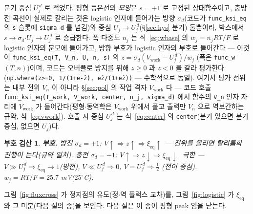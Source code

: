 \documentclass[11pt,a4paper]{article}
\newtheorem*{signbox}{부호 검산}
\newcommand{\eq}{\mathrm{eq}}
\newcommand{\work}{\mathrm{work}}
\newcommand{\code}[1]{\texttt{#1}}
\begin{document}
분기 중심 $U_j^{\,d}$ 로 적었다. 평형 등온선의 \emph{모양}은 $s=+1$ 로 고정된 상태함수이고, 충방전 곡선이 실제로 갈리는
것은 logistic 인자에 들어가는 방향 $\sigma_d$(코드가 \code{func\_ksi\_eq} 의 \code{s} 슬롯에 \code{sigma\_d} 를 넘김)와
중심 $U_j\to U_j^{\,d}$(\S\ref{sec:hys} 분기) 둘뿐이라, 박스에서 $s\to\sigma_d$$\cdot$$U_j\to U_j^{\,d}$ 로 승급한다.
폭 다중도 $n_j$ 는 식~\eqref{eq:wbase} 의 $w_j=n_jRT/F$ 로 logistic 인자의 분모에 들어가고, 방향 부호가 logistic
인자의 부호로 들어간다 --- 이것이 \code{func\_ksi\_eq(T, V\_n, U, n, s)} 의 $z=\sigma_d(V_\work-U_j^{\,d})/w_j$
(폭은 \code{func\_w}$(T,n)$)이며, 코드는 오버플로 방지를 위해 $z\ge0$ 과 $z<0$ 을 갈라 평가한다
(\code{np.where(z>=0, 1/(1+e\^{-z}), e\^{z}/(1+e\^{z}))} --- 수학적으로 동일). 여기서 평가 전위는 내부 전위 $V_n$ 이
아니라 \S\ref{sec:pol} 의 작업 격자 $V_\work$ 다 --- 코드 호출 \code{func\_ksi\_eq(T\_work, V\_work, center, n\_j, sigma\_d)}
에서 함수의 \code{V\_n} 인자 자리에 $V_\work$ 가 들어간다(평형$\cdot$동역학은 $V_\work$ 위에서 풀고 출력만 $V_n$ 으로
역보간하는 규약, 식~\eqref{eq:vwork}). 호출 시 중심 $U_j^{\,d}$ 는 식~\eqref{eq:center} 의 \code{center}(분기 있으면
분기 중심, 없으면 $U_j$)다.

\begin{signbox}
\textbf{부호.} 방전 $\sigma_d=+1$: $V\!\uparrow\Rightarrow z\!\uparrow\Rightarrow\xi_\eq\!\uparrow$ --- 전위를 올리면
탈리튬화 진행이 는다(규약 일치). 충전 $\sigma_d=-1$: $V\!\uparrow\Rightarrow z\!\downarrow\Rightarrow\xi_\eq\!\downarrow$.
극한 --- $V\gg U_j^{\,d}\Rightarrow\xi_\eq\to1$(방전), $V\ll U_j^{\,d}\Rightarrow0$, $V=U_j^{\,d}\Rightarrow\tfrac12$
(전이 중심). $w_j=RT/F=25.7$ mV($25^\circ$C).
\end{signbox}

그림~\ref{fig:fluxcross} 가 정지점의 유도(정$\cdot$역 플럭스 교차)를, 그림~\ref{fig:logistic} 가 $\xi_\eq$ 와 그
미분(다음 절의 종)을 보인다. 다음 절은 이 종이 평형 peak 임을 닫는다.
\end{document}
